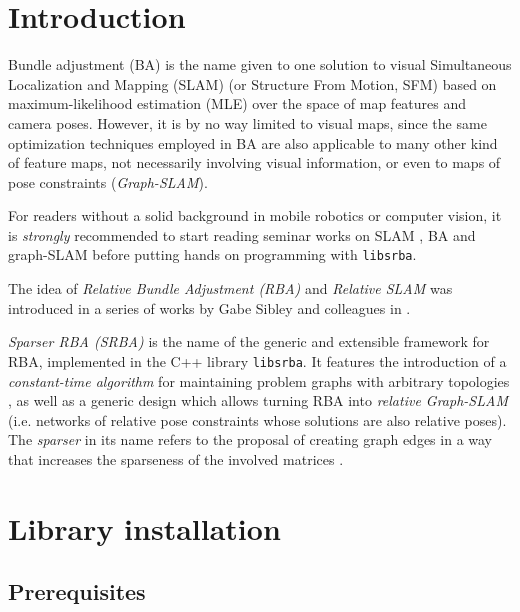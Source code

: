 \documentclass[a4paper,11pt]{article}
\begin{document}
\vspace{1cm}

\newpage
\tableofcontents
\newpage

\section{Introduction}

Bundle adjustment (BA) is the name given to one solution to visual Simultaneous Localization and Mapping (SLAM) (or Structure From Motion, SFM) 
based on maximum-likelihood estimation (MLE) over the space of map features and camera poses. 
However, it is by no way limited to visual maps, since the same 
optimization techniques employed in BA are also applicable to many other 
kind of feature maps, not necessarily involving visual information, or even to maps of pose constraints 
(\emph{Graph-SLAM}).

For readers without a solid background in mobile robotics or computer vision, it is \emph{strongly} recommended 
to start reading seminar works on SLAM \cite{thrun2005pr,durrantwhyte2006sla,bailey2006sla}, 
BA \cite{triggs2000bundle} and graph-SLAM \cite{grisetti2010tgb} before putting hands on
programming with \texttt{libsrba}.

The idea of \emph{Relative Bundle Adjustment (RBA)} and \emph{Relative SLAM} was introduced in a series 
of works by Gabe Sibley and colleagues in \cite{sibley2009rba,sibley2009adaptive,mei2011rslam}. 

\emph{Sparser RBA (SRBA)} is the name of the generic and extensible framework for RBA, implemented in 
the C++ library \texttt{libsrba}. It features the introduction of 
a \emph{constant-time algorithm} for maintaining problem graphs with arbitrary topologies \cite{blanco2013srba}, 
as well as a generic design which allows turning RBA 
into \emph{relative Graph-SLAM} (i.e. networks of relative pose constraints whose solutions are also relative poses).
The \emph{sparser} in its name refers to the proposal of creating graph edges in a way that increases the sparseness 
of the involved matrices \cite{blanco2013srba}.

\newpage
\section{Library installation}

\subsection{Prerequisites}
\end{document}
